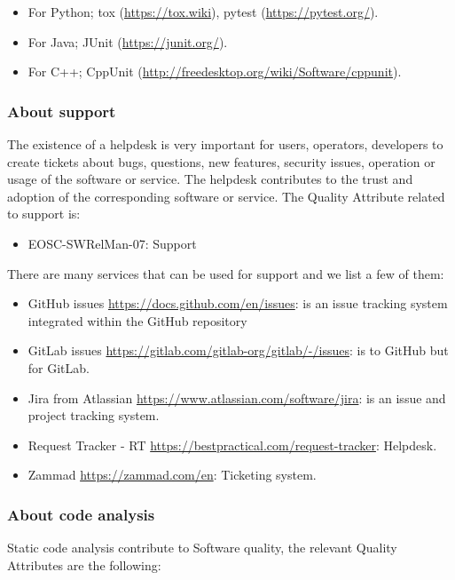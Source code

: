 \begin{itemize}
\item For Python; tox (\url{https://tox.wiki}), pytest (\url{https://pytest.org/}).
\item For Java; JUnit (\url{https://junit.org/}).
\item For C++; CppUnit (\url{http://freedesktop.org/wiki/Software/cppunit}).
\end{itemize}

\subsubsection{About support}

The existence of a helpdesk is very important for users, operators, developers to create tickets about bugs, questions, new features, security issues, operation or usage of the software or service. The helpdesk contributes to the trust and adoption of the corresponding software or service. The Quality Attribute related to support is:

\begin{itemize}
  \item EOSC-SWRelMan-07: Support
\end{itemize}

There are many services that can be used for support and we list a few of them:

\begin{itemize}
  \item GitHub issues \url{https://docs.github.com/en/issues}: is an issue tracking system integrated within the GitHub repository
  \item GitLab issues \url{https://gitlab.com/gitlab-org/gitlab/-/issues}: is to GitHub but for GitLab.
  \item Jira from Atlassian \url{https://www.atlassian.com/software/jira}: is an issue and project tracking system.
  \item Request Tracker - RT \url{https://bestpractical.com/request-tracker}: Helpdesk.
  \item Zammad \url{https://zammad.com/en}: Ticketing system.
\end{itemize}

\subsubsection{About code analysis}

Static code analysis contribute to Software quality, the relevant Quality Attributes are the following:

